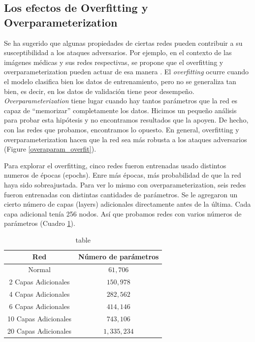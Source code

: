 


\subsection{Los efectos de Overfitting y Overparameterization}

Se ha sugerido que algunas propiedades de ciertas redes pueden contribuir a su susceptibilidad a los ataques adversarios. Por ejemplo, en el contexto de las imágenes médicas y sus redes respectivas, se propone que el overfitting y overparameterization pueden actuar de esa manera \cite{ma2020understanding}. El \textit{overfitting} ocurre cuando el modelo clasifica bien los datos de entrenamiento, pero no se generaliza tan bien, es decir, en los datos de validación tiene peor desempeño. \textit{Overparameterization} tiene lugar cuando hay tantos parámetros que la red es capaz de ``memorizar'' completamente los datos. Hicimos un pequeño análisis para probar esta hipótesis y no encontramos resultados que la apoyen. De hecho, con las redes que probamos, encontramos lo opuesto. En general, overfitting y overparameterization hacen que la red sea más robusta a los ataques adversarios (Figure \ref{overaparam_overfit}).

Para explorar el overfitting, cinco redes fueron entrenadas usado distintos numeros de épocas (epochs). Enre más épocas, más probabilidad de que la red haya sido sobreajustada. Para ver lo mismo con overparameterization, seis redes fueron entrenadas con distintas cantidades de parámetros. Se le agregaron un cierto número de capas (layers) adicionales directamente antes de la última. Cada capa adicional tenía 256 nodos. Así que probamos redes con varios números de parámetros (Cuadro \ref{overparam_table}).

\begin{table}[h]
    \centering
    \begin{tabular}{|c|c|}
     \hline
     Red & Número de parámetros  \\ 
     \hline
     Normal & $61,706$  \\ 
     \hline
     2 Capas Adicionales & $150,978$  \\ 
     \hline
     4 Capas Adicionales & $282,562$  \\ 
     \hline
     6 Capas Adicionales & $414,146$  \\ 
     \hline
     10 Capas Adicionales & $743,106$  \\ 
     \hline
     20 Capas Adicionales & $1,335,234$  \\ 
     \hline
    \end{tabular}
    \caption{table}
    \label{overparam_table}
\end{table}

